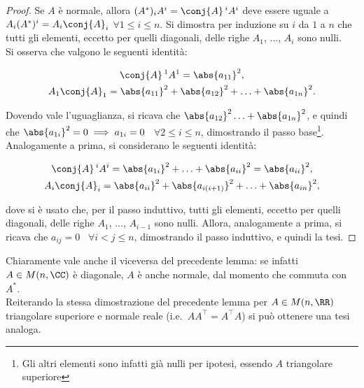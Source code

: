 \documentclass[11pt]{article}
\begin{document}
	\begin{proof}
		Se $A$ è normale, allora $(A^*)_i A^i = \conj{A}\,^i A^i$ deve essere uguale a
		$A_i (A^*)^i = A_i \conj{A}_i$ $\forall 1 \leq i \leq n$. Si dimostra per induzione
		su $i$ da $1$ a $n$ che tutti gli elementi, eccetto per quelli diagonali, delle
		righe $A_1$, ..., $A_i$ sono nulli. \\
		
		\basestep Si osserva che valgono le seguenti identità:
		
		\begin{gather*}
			\conj{A}\,^1 A^1 = \abs{a_{11}}^2, \\
			A_1 \conj{A}_1 = \abs{a_{11}}^2 + \abs{a_{12}}^2 + \ldots + \abs{a_{1n}}^2.
		\end{gather*}
		
		Dovendo vale l'uguaglianza, si ricava che $\abs{a_{12}}^2 \ldots + \abs{a_{1n}}^2$,
		e quindi che $\abs{a_{1i}}^2 = 0 \implies a_{1i} = 0$ \, $\forall 2 \leq i \leq n$,
		dimostrando il passo base\footnote{Gli altri elementi sono infatti già nulli per ipotesi, essendo
		$A$ triangolare superiore}. \\
		
		\inductivestep Analogamente a prima, si considerano le seguenti identità:
		
		\begin{gather*}
			\conj{A}\,^i A^i = \abs{a_{1i}}^2 + \ldots +  \abs{a_{ii}}^2 = \abs{a_{ii}}^2, \\
			A_i \conj{A}_i = \abs{a_{ii}}^2 + \abs{a_{i(i+1)}}^2 + \ldots + \abs{a_{in}}^2,
		\end{gather*}
		
		dove si è usato che, per il passo induttivo, tutti gli elementi, eccetto per quelli diagonali, delle
		righe $A_1$, ..., $A_{i-1}$ sono nulli. Allora, analogamente a prima, si ricava che
		$a_{ij} = 0$ \, $\forall i < j \leq n$, dimostrando il passo induttivo, e quindi la tesi.
	\end{proof}
	
	\begin{remark}\nl
		\li Chiaramente vale anche il viceversa del precedente lemma: se infatti $A \in M(n, \CC)$ è diagonale,
		$A$ è anche normale, dal momento che commuta con $A^*$. \\
		\li Reiterando la stessa dimostrazione del precedente lemma per $A \in M(n, \RR)$ triangolare superiore e normale reale (i.e.~$AA^\top = A^\top A$) si può ottenere una tesi analoga.
	\end{remark}
	
\end{document}
